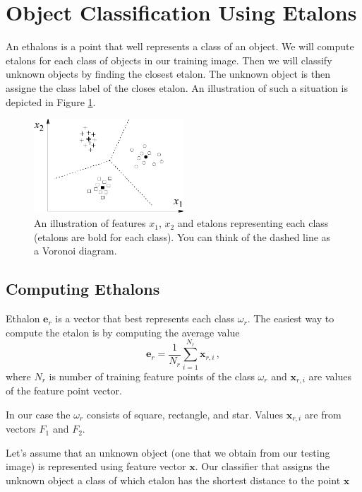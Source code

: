 \documentclass[12pt]{article}
\begin{document}
\section*{Object Classification Using Etalons}

An ethalons is a point that well represents a class of an object. We will compute etalons for each class of objects in our training image.
Then we will classify unknown objects by finding the closest etalon. The unknown object is then assigne the class label of the closes etalon.
An illustration of such a situation is depicted in Figure \ref{fig:etalons_diagram}.

\begin{figure}[h]
\begin{centering}
\includegraphics[width=0.5\textwidth]{etalons_diagram.png}
\caption{An illustration of features $x_1$, $x_2$ and etalons representing each class (etalons are bold for each class). You can think of the dashed line as a Voronoi diagram.}
\label{fig:etalons_diagram}
\end{centering}
\end{figure}


\subsection*{Computing Ethalons}

Ethalon $\mathbf{e}_r$ is a vector that best represents each class $\omega_r$.
The easiest way to compute the etalon is by computing the average value
\begin{equation}
    \mathbf{e}_r = \frac{1}{N_r}\sum\limits_{i=1}^{N_r} \mathbf{x}_{r, i} \, ,
    \label{eq:average}
\end{equation}
where $N_r$ is number of training feature points of the class $\omega_r$ and $\mathbf{x}_{r, i}$ are values of the feature point vector.

In our case the  $\omega_r$ consists of square, rectangle, and star. Values $\mathbf{x}_{r, i}$ are from vectors $F_1$ and $F_2$.

Let's assume that an unknown object (one that we obtain from our testing image) is represented using feature vector $\mathbf{x}$.
Our classifier that assigns the unknown object a class of which etalon has the shortest distance to the point $\mathbf{x}$
\end{document}
